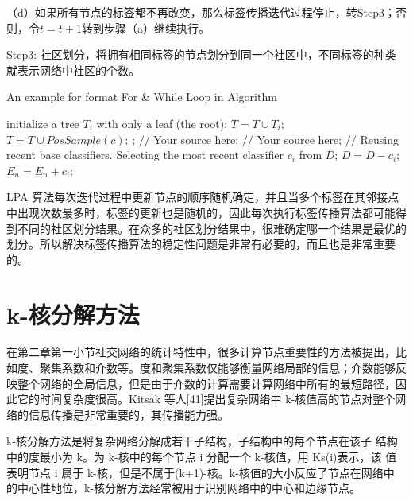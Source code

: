 （d）如果所有节点的标签都不再改变，那么标签传播迭代过程停止，转Step3；否则，令$t = t+1$转到步骤（a）继续执行。 

Step3:  社区划分，将拥有相同标签的节点划分到同一个社区中，不同标签的种类就表示网络中社区的个数。 
\usepackage{algorithm}  
\usepackage{algpseudocode}  
\usepackage{amsmath}  
\renewcommand{\algorithmicrequire}{\textbf{Input:}}  %
\renewcommand{\algorithmicensure}{\textbf{Output:}} %

\begin{algorithm}[h]  
  \caption{An example for format For \& While Loop in Algorithm}  
  \begin{algorithmic}[1]  
      \State initialize a tree $T_{i}$ with only a leaf (the root);  
      \State $T=T\cup T_{i};$  
    \EndFor  
      \label{code:TrainBase:getc}  
      \State $T=T\cup PosSample(c)$;  
      \label{code:TrainBase:pos}  
    \EndFor;  
      \State $//$ Your source here;  
    \EndFor  
      \State $//$ Your source here;  
    \EndFor  
    \State $//$ Reusing recent base classifiers.  
    \label{code:recentStart}  
      \State Selecting the most recent classifier $c_i$ from $D$;  
      \State $D=D-c_i$;  
      \State $E_n=E_n+c_i$;  
    \EndWhile  
    \label{code:recentEnd}  
  \end{algorithmic}  
\end{algorithm}  

LPA 算法每次迭代过程中更新节点的顺序随机确定，并且当多个标签在其邻接点中出现次数最多时，标签的更新也是随机的，因此每次执行标签传播算法都可能得到不同的社区划分结果。在众多的社区划分结果中，很难确定哪一个结果是最优的划分。所以解决标签传播算法的稳定性问题是非常有必要的，而且也是非常重要的。

\section{k-核分解方法}
在第二章第一小节社交网络的统计特性中，很多计算节点重要性的方法被提出，比如度、聚集系数和介数等。度和聚集系数仅能够衡量网络局部的信息；介数能够反映整个网络的全局信息，但是由于介数的计算需要计算网络中所有的最短路径，因此它的时间复杂度很高。Kitsak 等人[41]提出复杂网络中 k-核值高的节点对整个网络的信息传播是非常重要的，其传播能力强。

k-核分解方法是将复杂网络分解成若干子结构，子结构中的每个节点在该子
结构中的度最小为 k。为 k-核中的每个节点 i 分配一个 k-核值，用 Ks(i)表示，该
值表明节点 i 属于 k-核，但是不属于(k+1)-核。k-核值的大小反应了节点在网络中
的中心性地位，k-核分解方法经常被用于识别网络中的中心和边缘节点。

